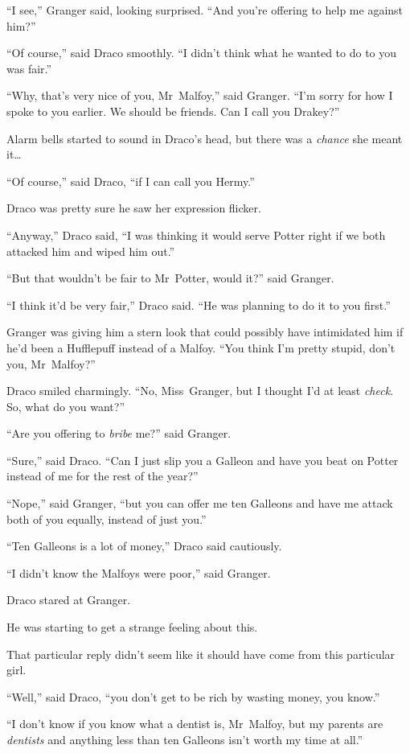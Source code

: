 “I see,” Granger said, looking surprised. “And you’re offering to help me against him?”

“Of course,” said Draco smoothly. “I didn’t think what he wanted to do to you was fair.”

“Why, that’s very nice of you, Mr~Malfoy,” said Granger. “I’m sorry for how I spoke to you earlier. We should be friends. Can I call you Drakey?”

Alarm bells started to sound in Draco’s head, but there was a \emph{chance} she meant it…

“Of course,” said Draco, “if I can call you Hermy.”

Draco was pretty sure he saw her expression flicker.

“Anyway,” Draco said, “I was thinking it would serve Potter right if we both attacked him and wiped him out.”

“But that wouldn’t be fair to Mr~Potter, would it?” said Granger.

“I think it’d be very fair,” Draco said. “He was planning to do it to you first.”

Granger was giving him a stern look that could possibly have intimidated him if he’d been a Hufflepuff instead of a Malfoy. “You think I’m pretty stupid, don’t you, Mr~Malfoy?”

Draco smiled charmingly. “No, Miss~Granger, but I thought I’d at least \emph{check.} So, what do you want?”

“Are you offering to \emph{bribe} me?” said Granger.

“Sure,” said Draco. “Can I just slip you a Galleon and have you beat on Potter instead of me for the rest of the year?”

“Nope,” said Granger, “but you can offer me ten Galleons and have me attack both of you equally, instead of just you.”

“Ten Galleons is a lot of money,” Draco said cautiously.

“I didn’t know the Malfoys were poor,” said Granger.

Draco stared at Granger.

He was starting to get a strange feeling about this.

That particular reply didn’t seem like it should have come from this particular girl.

“Well,” said Draco, “you don’t get to be rich by wasting money, you know.”

“I don’t know if you know what a dentist is, Mr~Malfoy, but my parents are \emph{dentists} and anything less than ten Galleons isn’t worth my time at all.”

